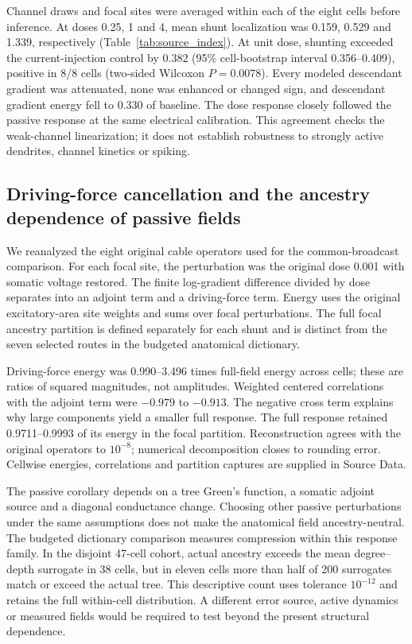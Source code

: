 Channel draws and focal sites were averaged within each of the eight cells
before inference. At doses 0.25, 1 and 4, mean shunt localization was 0.159,
0.529 and 1.339, respectively (Table~\ref{tab:source_index}). At unit dose,
shunting exceeded the current-injection control by 0.382 (95\% cell-bootstrap
interval 0.356--0.409), positive in 8/8 cells (two-sided Wilcoxon $P=0.0078$).
Every modeled descendant gradient was attenuated, none was enhanced or changed
sign, and descendant gradient energy fell to 0.330 of baseline. The dose
response closely followed the passive response at the same electrical
calibration. This agreement checks the weak-channel linearization; it does
not establish robustness to strongly active dendrites, channel kinetics or
spiking.

\subsection{Driving-force cancellation and the ancestry dependence of passive fields}
\label{sec:passive_field_diagnostics}
We reanalyzed the eight original cable operators used for the common-broadcast comparison. For each focal site, the perturbation was the original dose 0.001 with somatic voltage restored. The finite log-gradient difference divided by dose separates into an adjoint term and a driving-force term. Energy uses the original excitatory-area site weights and sums over focal perturbations. The full focal ancestry partition is defined separately for each shunt and is distinct from the seven selected routes in the budgeted anatomical dictionary.

Driving-force energy was 0.990--3.496 times full-field energy across cells; these are ratios of squared magnitudes, not amplitudes. Weighted centered correlations with the adjoint term were $-0.979$ to $-0.913$. The negative cross term explains why large components yield a smaller full response. The full response retained 0.9711--0.9993 of its energy in the focal partition. Reconstruction agrees with the original operators to $10^{-8}$; numerical decomposition closes to rounding error. Cellwise energies, correlations and partition captures are supplied in Source Data.

The passive corollary depends on a tree Green's function, a somatic adjoint source and a diagonal conductance change. Choosing other passive perturbations under the same assumptions does not make the anatomical field ancestry-neutral. The budgeted dictionary comparison measures compression within this response family. In the disjoint 47-cell cohort, actual ancestry exceeds the mean degree--depth surrogate in 38 cells, but in eleven cells more than half of 200 surrogates match or exceed the actual tree. This descriptive count uses tolerance $10^{-12}$ and retains the full within-cell distribution. A different error source, active dynamics or measured fields would be required to test beyond the present structural dependence.
